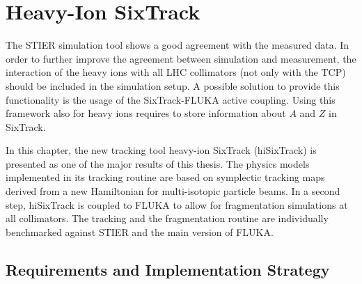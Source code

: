 \chapter{Heavy-Ion SixTrack} \label{chap:hisix}

The STIER simulation tool shows a good agreement with the measured data. In order to further improve the agreement between simulation and measurement, the interaction of the heavy ions with all LHC collimators (not only with the TCP) should be included in the simulation setup. A possible solution to provide this functionality is the usage of the SixTrack-FLUKA active coupling. Using this framework also for heavy ions requires to store information about $A$ and $Z$ in SixTrack. 

In this chapter, the new tracking tool heavy-ion SixTrack \mbox{(hiSixTrack)} is presented as one of the major results of this thesis. The physics models implemented in its tracking routine are based on symplectic tracking maps derived from a new Hamiltonian for multi-isotopic particle beams. In a second step, hiSixTrack is coupled to FLUKA to allow for fragmentation simulations at all collimators. The tracking and the fragmentation routine are individually benchmarked against STIER and the main version of FLUKA.


\section{Requirements and Implementation Strategy}

